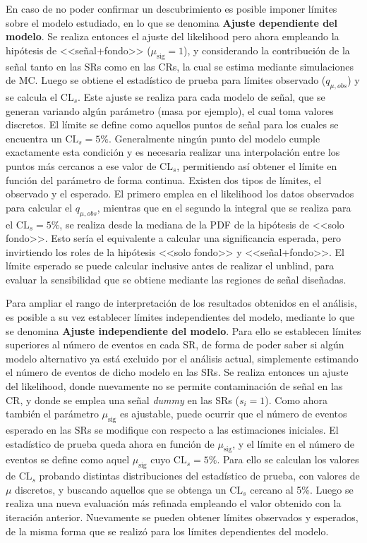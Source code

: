 En caso de no poder confirmar un descubrimiento es posible imponer límites sobre el modelo estudiado, en lo que se denomina \textbf{Ajuste dependiente del modelo}. 
Se realiza entonces el ajuste del likelihood pero ahora empleando la hipótesis de <<señal+fondo>> ($\mu_\text{sig}=1$), y considerando la contribución de la señal tanto en las SRs como en las CRs, la cual se estima mediante simulaciones de MC. Luego se obtiene el estadístico de prueba para límites observado ($q_{\mu, obs}$) y se calcula el $\text{CL}_{s}$. Este ajuste se realiza para cada modelo de señal, que se generan variando algún parámetro (masa por ejemplo), el cual toma valores discretos. El límite se define como aquellos puntos de señal para los cuales se encuentra un $\text{CL}_{s}=5\%$. Generalmente ningún punto del modelo cumple exactamente esta condición y es necesaria realizar una interpolación entre los puntos más cercanos a ese valor de $\text{CL}_{s}$, permitiendo así obtener el límite en función del parámetro de forma continua. Existen dos tipos de límites, el observado y el esperado. El primero emplea en el likelihood los datos observados para calcular el $q_{\mu, obs}$, mientras que en el segundo la integral que se realiza para el $\text{CL}_{s}=5\%$, se realiza desde la mediana de la PDF de la hipótesis de <<solo fondo>>. Esto sería el equivalente a calcular una significancia esperada, pero invirtiendo los roles de la hipótesis <<solo fondo>> y <<señal+fondo>>.
El límite esperado se puede calcular inclusive antes de realizar el unblind, para evaluar la sensibilidad que se obtiene mediante las regiones de señal diseñadas.

Para ampliar el rango de interpretación de los resultados obtenidos en el análisis, es posible a su vez establecer límites independientes del modelo, mediante lo que se denomina \textbf{Ajuste independiente del modelo}. Para ello se establecen límites superiores al número de eventos en cada SR, de forma de poder saber si algún modelo alternativo ya está excluido por el análisis actual, simplemente estimando el número de eventos de dicho modelo en las SRs. Se realiza entonces un ajuste del likelihood, donde nuevamente no se permite contaminación de señal en las CR, y donde se emplea una señal \textit{dummy} en las SRs ($s_i=1$). Como ahora también el parámetro $\mu_\text{sig}$ es ajustable, puede ocurrir que el número de eventos esperado en las SRs se modifique con respecto a las estimaciones iniciales. El estadístico de prueba queda ahora en función de $\mu_\text{sig}$, y el límite en el número de eventos se define como aquel $\mu_\text{sig}$ cuyo $\text{CL}_{s}=5\%$. Para ello se calculan los valores de $\text{CL}_{s}$ probando distintas distribuciones del estadístico de prueba, con valores de $\mu$ discretos, y buscando aquellos que se obtenga un $\text{CL}_{s}$ cercano al 5\%. Luego se realiza una nueva evaluación más refinada empleando el valor obtenido con la iteración anterior. Nuevamente se pueden obtener límites observados y esperados, de la misma forma que se realizó para los límites dependientes del modelo.


